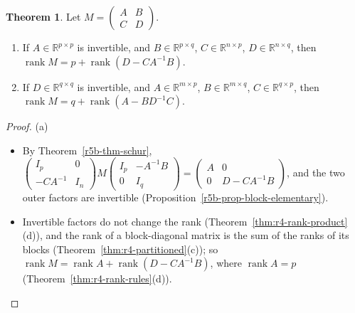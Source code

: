 \documentclass[12pt]{article}
\newcommand{\R}{\mathbb R}
\DeclareMathOperator{\rank}{rank}
\theoremstyle{definition}
\newtheorem{theorem}{Theorem}
\begin{document}
\begin{theorem}\label{r5d-thm-schur-rank}
Let \(M=\begin{pmatrix}A&B\\C&D\end{pmatrix}\).
\begin{enumerate}
\item If \(A\in\R^{p\times p}\) is invertible, and \(B\in\R^{p\times q}\), \(C\in\R^{n\times p}\),
\(D\in\R^{n\times q}\), then \(\rank M=p+\rank(D-CA^{-1}B)\).
\item If \(D\in\R^{q\times q}\) is invertible, and \(A\in\R^{m\times p}\), \(B\in\R^{m\times q}\),
\(C\in\R^{q\times p}\), then \(\rank M=q+\rank(A-BD^{-1}C)\).
\end{enumerate}
\end{theorem}
\begin{proof}
(a)
\begin{itemize}
\item By Theorem~\ref{r5b-thm-schur},
\(\left(\begin{smallmatrix}I_p&0\\-CA^{-1}&I_n\end{smallmatrix}\right)M
\left(\begin{smallmatrix}I_p&-A^{-1}B\\0&I_q\end{smallmatrix}\right)
=\left(\begin{smallmatrix}A&0\\0&D-CA^{-1}B\end{smallmatrix}\right)\), and the two outer factors are
invertible (Proposition~\ref{r5b-prop-block-elementary}).
\item Invertible factors do not change the rank (Theorem~\ref{thm:r4-rank-product}(d)), and the rank
of a block-diagonal matrix is the sum of the ranks of its blocks
(Theorem~\ref{thm:r4-partitioned}(c)); so \(\rank M=\rank A+\rank(D-CA^{-1}B)\), where \(\rank A=p\)
(Theorem~\ref{thm:r4-rank-rules}(d)).
\end{itemize}


\end{proof}
\end{document}
